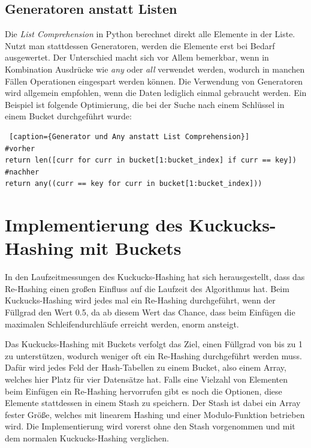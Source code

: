 \subsection{Generatoren anstatt Listen}
Die \textit{List Comprehension} in Python berechnet direkt alle Elemente in der Liste. Nutzt man stattdessen Generatoren, werden die Elemente erst bei Bedarf ausgewertet. Der Unterschied macht sich vor Allem bemerkbar, wenn in Kombination Ausdrücke wie \textit{any} oder \textit{all} verwendet werden, wodurch in manchen Fällen Operationen eingespart werden können. Die Verwendung von Generatoren wird allgemein empfohlen, wenn die Daten lediglich einmal gebraucht werden. Ein Beispiel ist folgende Optimierung, die bei der Suche nach einem Schlüssel in einem Bucket durchgeführt wurde:
\begin{lstlisting} [caption={Generator und Any anstatt List Comprehension}]
#vorher
return len([curr for curr in bucket[1:bucket_index] if curr == key])
#nachher
return any((curr == key for curr in bucket[1:bucket_index]))         
\end{lstlisting}

\section{Implementierung des Kuckucks-Hashing mit Buckets}
In den Laufzeitmessungen des Kuckucks-Hashing hat sich herausgestellt, dass das Re-Hashing einen großen Einfluss auf die Laufzeit des Algorithmus hat. Beim Kuckucks-Hashing  wird jedes mal ein Re-Hashing durchgeführt, wenn der Füllgrad den Wert 0.5, da ab diesem Wert das Chance, dass beim Einfügen die maximalen Schleifendurchläufe erreicht werden, enorm ansteigt. 

Das Kuckucks-Hashing mit Buckets verfolgt das Ziel, einen Füllgrad von bis zu 1 zu unterstützen, wodurch weniger oft ein Re-Hashing durchgeführt werden muss. Dafür wird jedes Feld der Hash-Tabellen zu einem Bucket, also einem Array, welches hier Platz für vier Datensätze hat. Falls eine Vielzahl von Elementen beim Einfügen ein Re-Hashing hervorrufen gibt es noch die Optionen, diese Elemente stattdessen in einem Stash zu speichern. Der Stash ist dabei ein Array fester Größe, welches mit linearem Hashing und einer Modulo-Funktion betrieben wird. Die Implementierung wird vorerst ohne den Stash vorgenommen und mit dem normalen Kuckucks-Hashing verglichen.

